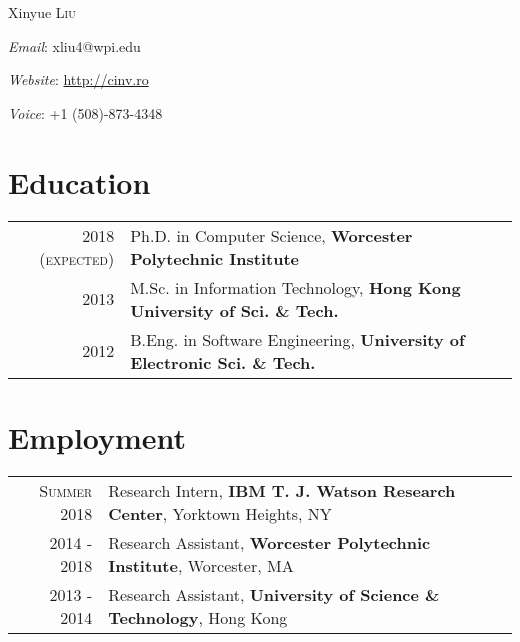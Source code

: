 \documentclass[a4paper,10pt]{article} %
\begin{document}
\pagestyle{empty} %

\par{\Huge Xinyue \textsc{Liu}}\par %
\vspace{1.5em}
\par{ \large \emph{Email}: xliu4@wpi.edu}
\par{ \large \emph{Website}: \url{http://cinv.ro}}
\par{ \large \emph{Voice}: +1 (508)-873-4348}
\vspace{0.5em}

\section{Education}
\begin{tabular}{rl}	
\textsc{2018 (expected)} & Ph.D. in Computer Science, \textbf{Worcester Polytechnic Institute}\\
\textsc{2013} & M.Sc. in Information Technology, \textbf{Hong Kong University of Sci. \& Tech.}\\
\textsc{2012}& B.Eng. in Software Engineering, \textbf{University of Electronic Sci. \& Tech.}\\
\end{tabular}

\section{Employment}
\begin{tabular}{rl}
\textsc{Summer 2018} & Research Intern,    \textbf{IBM T. J. Watson Research Center}, Yorktown Heights, NY \\
\textsc{2014 - 2018} & Research Assistant, \textbf{Worcester Polytechnic Institute}, Worcester, MA  \\
\textsc{2013 - 2014} & Research Assistant, \textbf{University of Science \& Technology}, Hong Kong  \\
\end{tabular}
\end{document}
